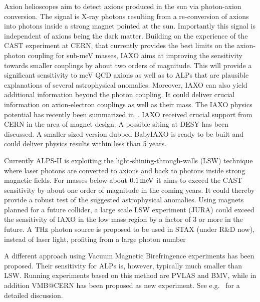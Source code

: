 \documentclass[../report.tex]{subfiles}
\begin{document}
 Axion helioscopes aim to detect axions produced in the sun via photon-axion conversion. The signal is X-ray photons resulting from a 
re-conversion of axions into photons inside a strong magnet pointed at the sun. Importantly this signal is independent of axions being the dark matter. 
Building on the experience of the CAST experiment at CERN, that currently provides the best limits on the axion-photon coupling for sub-meV masses, IAXO aims at improving the sensitivity towards smaller couplings by about two orders of magnitude. This will provide a significant sensitivity to meV QCD axions as well as to ALPs that are plausible explanations of several astrophysical anomalies. Moreover, IAXO can also yield additional information beyond the photon coupling. It could deliver crucial information on axion-electron couplings as well as their mass. The IAXO physics potential has recently been summarized in~\cite{Armengaud:2019uso}.
IAXO received crucial support from CERN in the area of magnet design. A possible siting at DESY has been discussed.
A smaller-sized version dubbed BabyIAXO is ready to be built and could deliver physics results within less than 5 
years. 

{} Currently ALPS-II \cite{Bahre:2013ywa} is exploiting the light-shining-through-walls (LSW) technique where laser photons are converted to axions and back to photons inside strong magnetic fields. For masses below about $0.1\,{\rm meV}$ it aims to exceed the CAST sensitivity by about one order of magnitude in the coming years. It could thereby provide a robust test of the suggested astrophysical anomalies.
Using magnets planned  for a future collider, a large scale LSW experiment (JURA) could exceed the sensitivity of IAXO  in the low mass region by a factor of 3
or more in the future.
A ${\rm THz}$ photon source is proposed to be used in STAX (under R\&D now), instead of laser light,
profiting from a large photon number

A different approach using Vacuum Magnetic Birefringence experiments has been proposed.
Their sensitivity for ALPs is, however, typically much smaller than LSW.
Running experiments based on this method are PVLAS and BMV, while in addition VMB@CERN has been proposed as new experiment. See e.g.~\cite{Siemko:2652165} for a detailed discussion.
\end{document}
